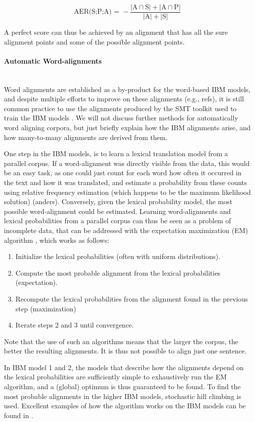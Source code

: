 \documentclass{report}
\newcommand{\myparagraph}[1]{\paragraph{#1}\mbox{}\\}
\theoremstyle{break}
\begin{document}
$$
\text{AER(S;P;A) = } - \frac{|\text{A}\cap\text{S}| + |\text{A}\cap\text{P}|}{|\text{A}| + |\text{S}|}
$$

A perfect score can thus be achieved by an alignment that has all the sure alignment points and some of the possible alignment points.

\myparagraph{Automatic Word-alignments}
Word alignments are established as a by-product for the word-based IBM models, and despite multiple efforts to improve on these alignments (e.g., refs), it is still common practice to use the alignments produced by the SMT toolkit used to train the IBM models \citep{och03:asc}. We will not discuss further methods for automatically word aligning corpora, but just briefly explain how the IBM alignments arise, and how many-to-many alignments are derived from them.

One step in the IBM models, is to learn a lexical translation model from a parallel corpus. If a word-alignment was directly visible from the data, this would be an easy task, as one could just count for each word how often it occurred in the text and how it was translated, and estimate a probability from these counts using relative frequency estimation (which happens to be the maximum likelihood solution) (anders). Conversely, given the lexical probability model, the most possible word-alignment could be estimated. Learning word-alignments and lexical probabilities from a parallel corpus can thus be seen as a problem of incomplete data, that can be addressed with the expectation maximization (EM) algorithm \citep{dempster1977maximum}, which works as follows:\begin{enumerate}
\item Initialize the lexical probabilities (often with uniform distributions).
\item Compute the most probable alignment from the lexical probabilities (expectation).
\item Recompute the lexical probabilities from the alignment found in the previous step (maximization)
\item Iterate steps 2 and 3 until convergence.
\end{enumerate}

\noindent Note that the use of such an algorithms means that the larger the corpus, the better the resulting alignments. It is thus not possible to align just one sentence.

In IBM model 1 and 2, the models that describe how the alignments depend on the lexical probabilities are sufficiently simple to exhaustively run the EM algorithm, and a (global) optimum is thus guaranteed to be found. To find the most probable alignments in the higher IBM models, stochastic hill climbing is used. Excellent examples of how the algorithm works on the IBM models can be found in \cite[p88-113]{koehn2008statistical}.
\end{document}
